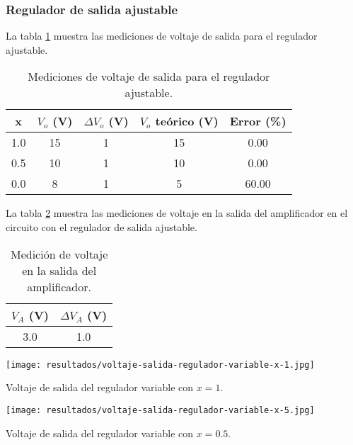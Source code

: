 \FloatBarrier
\subsubsection{Regulador de salida ajustable}

La tabla \ref{tab:mediciones-regulador-ajustable} muestra las mediciones de voltaje de salida para el regulador ajustable.

\begin{table}[ht]
    \centering
    \begin{tabular}{|c|c|c|c|c|}
        \hline
        x & $V_o$ (V) & $\Delta V_o$ (V) & $V_o$ teórico (V) & Error (\%) \\
        \hline
        1.0 & 15 & 1 & 15 & 0.00 \\
        0.5 & 10 & 1 & 10 & 0.00 \\
        0.0 & 8 & 1 & 5 & 60.00 \\
        \hline
    \end{tabular}
    \caption{Mediciones de voltaje de salida para el regulador ajustable.}
    \label{tab:mediciones-regulador-ajustable}
\end{table}

La tabla \ref{tab:mediciones-amplificador-regulador-ajustable} muestra las mediciones de voltaje en la salida del amplificador en el circuito con el regulador de salida ajustable.

\begin{table}[ht]
    \centering
    \begin{tabular}{|c|c|}
        \hline
        $V_A$ (V) & $\Delta V_A$ (V) \\
        \hline
        3.0 & 1.0 \\
        \hline
    \end{tabular}
    \caption{Medición de voltaje en la salida del amplificador.}
    \label{tab:mediciones-amplificador-regulador-ajustable}
\end{table}

\begin{ilustracion}[ht]
    \centering
    \texttt{[image: resultados/voltaje-salida-regulador-variable-x-1.jpg]}
    \caption{Voltaje de salida del regulador variable con $x = 1$.}
    \label{ilus:voltaje-salida-regulador-variable-x-1}
\end{ilustracion}

\begin{ilustracion}[ht]
    \centering
    \texttt{[image: resultados/voltaje-salida-regulador-variable-x-5.jpg]}
    \caption{Voltaje de salida del regulador variable con $x = 0.5$.}
    \label{ilus:voltaje-salida-regulador-variable-x-5}
\end{ilustracion}

